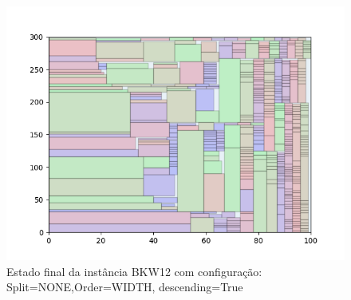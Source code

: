 \begin{figure}[H]
    \centering
    \caption[]{Estado final da instância BKW12 com configuração: Split=NONE,Order=WIDTH, descending=True}
    \label{fig:bkw12-none-width-true}
    \includegraphics[scale=0.5]{output/figures/bkw/bkw12/none/width/true/000}
\end{figure}